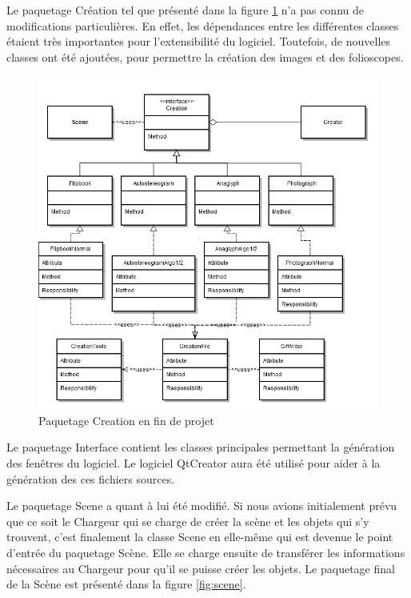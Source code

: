 Le paquetage Création tel que présenté dans la figure \ref{fig:creation} n'a pas connu de modifications particulières. En effet, les dépendances entre les différentes classes étaient très importantes pour l'extensibilité du logiciel. Toutefois, de nouvelles classes ont été ajoutées, pour permettre la création des images et des folioscopes.

\begin{figure}[h]
		\centering
                \includegraphics[scale=0.5]{f_creation.png}
		\caption{\label{fig:creation} Paquetage Creation en fin de projet \protect \footnotemark}
\end{figure}


Le paquetage Interface contient les classes principales permettant la génération des fenêtres du logiciel. Le logiciel QtCreator aura été utilisé pour aider à la génération des ces fichiers sources.

Le paquetage Scene a quant à lui été modifié. Si nous avions initialement prévu que ce soit le Chargeur qui se charge de créer la scène et les objets qui s'y trouvent, c'est finalement la classe Scene en elle-même qui est devenue le point d'entrée du paquetage Scène. Elle se charge ensuite de transférer les informations nécessaires au Chargeur pour qu'il se puisse créer les objets. Le paquetage final de la Scène est présenté dans la figure \ref{fig:scene}.

